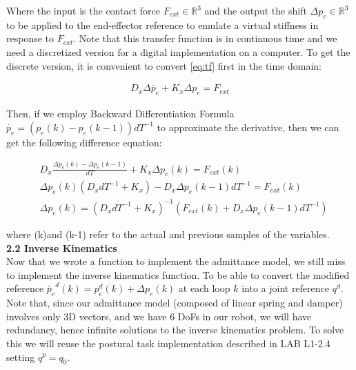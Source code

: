 \documentclass[11pt]{article}
\newcommand{\Rnum}{\mathbb{R}} %
\begin{document}
Where the input is the contact force $F_{ext}\in \Rnum^3$ and the output the shift  $\Delta p_e\in \Rnum^3$ to be applied to the end-effector reference to emulate a virtual stiffness in response to  $F_{ext}$. Note that this transfer function is in continuous time and we need a discretized version for a digital implementation on a computer. To get the discrete version, it is convenient to convert \eqref{eq:tf} first in the time domain:

\begin{align*}
D_x \Delta\dot{ p_e} + K_x{\Delta p_e}  =  F_{ext}  
\end{align*}
 
Then, if  we  employ Backward Differentiation Formula $\dot{p_e} = (p_e(k)- p_e(k-1))dT^{-1}$ to approximate the derivative, then we can get the following difference equation:

\begin{align*}
&D_x \frac{\Delta p_e(k)- \Delta p_e(k-1)}{dT}  + K_x \Delta p_e(k)  =  F_{ext}(k)  \\
&\Delta p_e(k) (D_x dT^{-1} + K_x ) - D_x \Delta p_e(k-1)dT^{-1} =  F_{ext}(k)\\
&\Delta p_e(k) =  (D_x dT^{-1} + K_x )^{-1} (F_{ext}(k) + D_x \Delta p_e(k-1)dT^{-1})
\end{align*}

where (k)and (k-1) refer to the actual and previous samples of the variables. \\

\textbf{2.2 Inverse Kinematics}\\
Now that we wrote a function to implement the admittance model, we still miss to implement the inverse kinematics function. To be able to convert the modified reference $\tilde{p_e}^d(k) = p_e^d(k) +  \Delta p_e(k)$  at each loop $k$ into a joint reference $q^d$. Note that, since our admittance model (composed of linear spring and damper)  involves only 3D vectors, and we have 6 DoFs in our robot, we will have redundancy, hence  infinite solutions to the inverse kinematics problem. To solve this we will reuse the postural task implementation described in LAB L1-2.4 setting  $q^p = q_0$.\\
\end{document}
